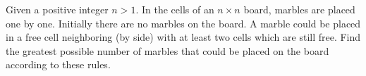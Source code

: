 Given a positive integer $n>1$. In the cells of an $n\times n$ board, marbles are placed one by one. Initially there are no marbles on the board. A marble could be placed in a free cell neighboring (by side) with at least two cells which are still free. Find the greatest possible number of marbles that could be placed on the board according to these rules.